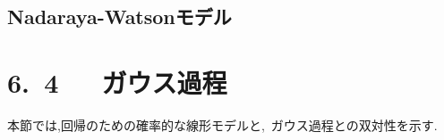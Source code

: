 \documentclass[11pt,a4paper]{jreport}
\begin{document}
\subsection{Nadaraya-Watsonモデル}

\section*{6.~4~~~ガウス過程}
本節では,回帰のための確率的な線形モデルと,~ガウス過程との双対性を示す.
\end{document}
